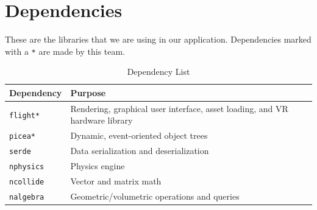 \documentclass[titlepage,12pt]{article}
\begin{document}
\section{Dependencies}
These are the libraries that we are using in our application. Dependencies
marked with a \texttt{*} are made by this team.
\begin{table}[H]
    \caption{Dependency List}\label{tab:milestones}
    \centering
    \begin{tabular}{|l|l|}
        \hline
        \textbf{Dependency} & \textbf{Purpose} \\
        \hline
        \hline
        \texttt{flight*} & Rendering, graphical user interface, asset loading,
            and VR hardware library \\
        \hline
        \texttt{picea*} & Dynamic, event-oriented object trees \\
        \hline
        \texttt{serde} & Data serialization and deserialization \\
        \hline
        \texttt{nphysics} & Physics engine \\
        \hline
        \texttt{ncollide} & Vector and matrix math \\
        \hline
        \texttt{nalgebra} & Geometric/volumetric operations and queries \\
        \hline
    \end{tabular}
\end{table}
\end{document}
